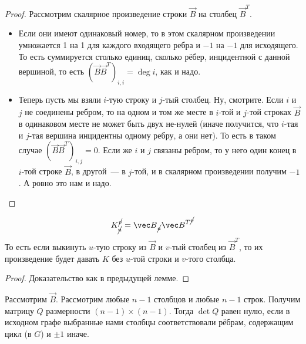 \documentclass{article}
\begin{document}
    \begin{proof}
        Рассмотрим скалярное произведение строки $\vec B$ на столбец $\vec B^T$.
        \begin{itemize}
            \item Если они имеют одинаковый номер, то в этом скалярном произведении умножается 1 на 1 для каждого входящего ребра и $-1$ на $-1$ для исходящего. То есть суммируется столько единиц, сколько рёбер, инцидентной с данной вершиной, то есть $(\vec B\vec B^T)_{i,i}=\deg i$, как и надо.
            \item Теперь пусть мы взяли $i$-тую строку и $j$-тый столбец. Ну, смотрите. Если $i$ и $j$ не соединены ребром, то на одном и том же месте в $i$-той и $j$-той строках $\vec B$ в одинаковом месте не может быть двух не-нулей (иначе получится, что $i$-тая и $j$-тая вершина инцидентны одному ребру, а они нет). То есть в таком случае $(\vec B\vec B^T)_{i,j}=0$. Если же $i$ и $j$ связаны ребром, то у него один конец в $i$-той строке $\vec B$, в другой~--- в $j$-той, и в скалярном произведении получим $-1$. А ровно это нам и надо.
        \end{itemize}
    \end{proof}
    \begin{lemma}
        $$
        K_{\cancel{u}}^{\cancel{v}}={\vec B}_{\cancel u}{{\vec B}^T}^{\cancel{v}}
        $$
        То есть если выкинуть $u$-тую строку из $\vec B$ и $v$-тый столбец из $\vec B^T$, то их произведение будет давать $K$ без $u$-той строки и $v$-того столбца.
    \end{lemma}
    \begin{proof}
        Доказательство как в предыдущей лемме.
    \end{proof}
    \begin{lemma}
        \label{Лемма об условии на дерево через матрицу}
        Рассмотрим $\vec B$. Рассмотрим любые $n-1$ столбцов и любые $n-1$ строк. Получим матрицу $Q$ размерности $(n-1)\times(n-1)$. Тогда $\det Q$ равен нулю, если в исходном графе выбранные нами столбцы соответствовали рёбрам, содержащим цикл (в $G$) и $\pm1$ иначе.
    \end{lemma}
\end{document}
